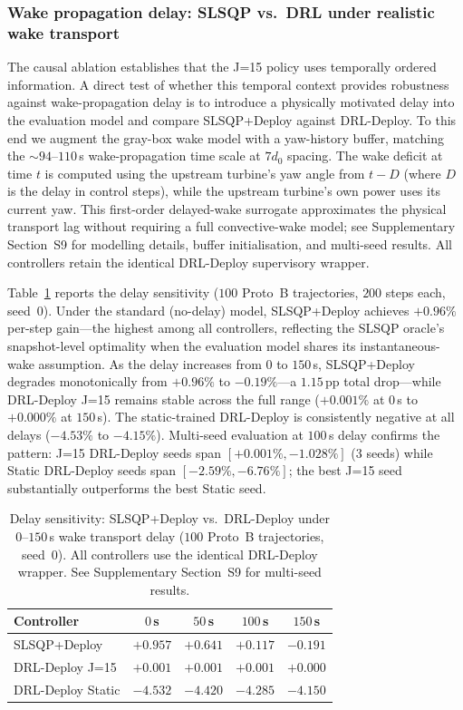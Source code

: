 \documentclass[final,5p,times]{elsarticle}
\begin{document}
\subsubsection{Wake propagation delay: SLSQP vs.\ DRL under realistic wake transport}\label{sec:wake_delay}

The causal ablation establishes that the J=15 policy uses temporally ordered information. A direct test of whether this temporal context provides robustness against wake-propagation delay is to introduce a physically motivated delay into the evaluation model and compare SLSQP+Deploy against DRL-Deploy. To this end we augment the gray-box wake model with a yaw-history buffer, matching the ${\sim}94$--$110$\,s wake-propagation time scale at $7d_0$ spacing. The wake deficit at time $t$ is computed using the upstream turbine's yaw angle from $t{-}D$ (where $D$ is the delay in control steps), while the upstream turbine's own power uses its current yaw. This first-order delayed-wake surrogate approximates the physical transport lag without requiring a full convective-wake model; see Supplementary Section~S9 for modelling details, buffer initialisation, and multi-seed results. All controllers retain the identical DRL-Deploy supervisory wrapper.

Table~\ref{tab:wake_delay} reports the delay sensitivity ($100$ Proto~B trajectories, $200$ steps each, seed~0). Under the standard (no-delay) model, SLSQP+Deploy achieves $+0.96\%$ per-step gain---the highest among all controllers, reflecting the SLSQP oracle's snapshot-level optimality when the evaluation model shares its instantaneous-wake assumption. As the delay increases from $0$ to $150$\,s, SLSQP+Deploy degrades monotonically from $+0.96\%$ to $-0.19\%$---a $1.15$\,pp total drop---while DRL-Deploy J=15 remains stable across the full range ($+0.001\%$ at $0$\,s to $+0.000\%$ at $150$\,s). The static-trained DRL-Deploy is consistently negative at all delays ($-4.53\%$ to $-4.15\%$). Multi-seed evaluation at $100$\,s delay confirms the pattern: J=15 DRL-Deploy seeds span $[+0.001\%, -1.028\%]$ (3 seeds) while Static DRL-Deploy seeds span $[-2.59\%, -6.76\%]$; the best J=15 seed substantially outperforms the best Static seed.

\begin{table}[h]
\centering
\caption{Delay sensitivity: SLSQP+Deploy vs.\ DRL-Deploy under $0$--$150$\,s wake transport delay ($100$ Proto~B trajectories, seed~0). All controllers use the identical DRL-Deploy wrapper. See Supplementary Section~S9 for multi-seed results.}
\label{tab:wake_delay}
\small
\begin{tabular}{lcccc}
\toprule
Controller & $0$\,s & $50$\,s & $100$\,s & $150$\,s \\
\midrule
SLSQP+Deploy       & $+0.957$ & $+0.641$ & $+0.117$ & $-0.191$ \\
DRL-Deploy J=15    & $+0.001$ & $+0.001$ & $+0.001$ & $+0.000$ \\
DRL-Deploy Static  & $-4.532$ & $-4.420$ & $-4.285$ & $-4.150$ \\
\bottomrule
\end{tabular}
\end{table}
\end{document}
